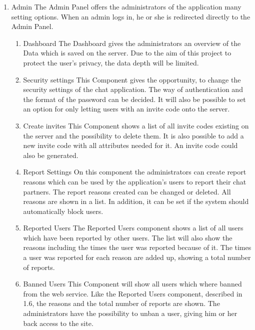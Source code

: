 \begin{enumerate}
    \item Admin
    The Admin Panel offers the administrators of the application many setting options.
    When an admin logs in, he or she is redirected directly to the Admin Panel.
    \begin{enumerate}
        \item Dashboard
        The Dashboard gives the administrators an overview of the Data which is saved on the server.
        Due to the aim of this project to protect the user’s privacy, the data depth will be limited.
        \item Security settings
        This Component gives the opportunity, to change the security settings of the chat application.
        The way of authentication and the format of the password can be decided.
        It will also be possible to set an option for only letting users with an invite code onto the server.
        \item Create invites
        This Component shows a list of all invite codes existing on the server and the possibility to delete them.
        It is also possible to add a new invite code with all attributes needed for it.
        An invite code could also be generated.
        \item Report Settings
        On this component the administrators can create report reasons which can be used by the application’s users
        to report their chat partners.
        The report reasons created can be changed or deleted.
        All reasons are shown in a list.
        In addition, it can be set if the system should automatically block users.
        \item Reported Users
        The Reported Users component shows a list of all users which have been reported by other users.
        The list will also show the reasons including the times the user was reported because of it.
        The times a user was reported for each reason are added up, showing a total number of reports.
        \item Banned Users
        This Component will show all users which where banned from the web service.
        Like the Reported Users component, described in 1.6, the reasons and the total number of reports are shown.
        The administrators have the possibility to unban a user, giving him or her back access to the site.
    \end{enumerate}
\end{enumerate}

